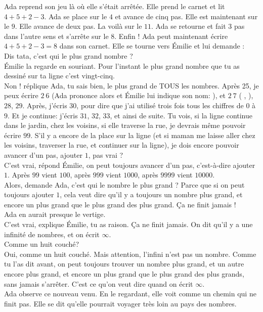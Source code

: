 Ada reprend son jeu là où elle s’était arrêtée. 
Elle prend le carnet et lit $4 + 5 + 2 - 3$. 
Ada se place sur le $4$ et avance de cinq pas. 
Elle est maintenant sur le $9$. 
Elle avance de deux pas. La voilà sur le $11$. 
Ada se retourne et fait $3$ pas dans l’autre sens et s’arrête sur le $8$.
Enfin ! Ada peut maintenant écrire $4 + 5 + 2 - 3 = 8$ dans son carnet.
Elle se tourne vers Émilie et lui demande :\\
\guillemotleft Dis tata, c’est qui le plus grand nombre ? \guillemotright\\
Émilie la regarde en souriant.
\guillemotleft Pour l’instant le plus grand nombre que tu as dessiné sur ta ligne c’est vingt-cinq.\\
\mdash Non ! réplique Ada, tu sais bien, le plus grand de TOUS les nombres. Après 25, je peux écrire $2~6$ (Ada prononce alors  et Émilie lui indique son nom: ), et $2~7$ ( , ), $28$, $29$. Après, j’écris $30$, pour dire que j’ai utilisé trois fois tous les chiffres de $0$ à $9$. Et je continue: j’écris $31$, $32$, $33$, et ainsi de suite. Tu vois, si la ligne continue dans le jardin, chez les voisins, si elle traverse la rue, je devrais même pouvoir écrire $99$. S'il y a encore de la place sur la ligne (et si maman me laisse aller chez les voisins, traverser la rue, et continuer sur la ligne), je dois encore pouvoir avancer d’un pas, ajouter $1$, pas vrai ?\\
\mdash C’est vrai, répond Émilie, on peut toujours avancer d’un pas, c’est-à-dire ajouter $1$. Après $99$ vient $100$, après $999$ vient $1000$, après $9999$ vient $10000$.\\
\mdash Alors, demande Ada, c’est qui le nombre le plus grand ? Parce que si on peut toujours ajouter $1$, cela veut dire qu’il y a toujours un nombre plus grand, et encore un plus grand que le plus grand des plus grand. Ça ne finit jamais ! \guillemotright\\ 
Ada en aurait presque le vertige. \\
\guillemotleft C’est vrai, explique Émilie, tu as raison. Ça ne finit jamais. On dit qu’il y a une infinité de nombres, et on écrit $\infty$.\\
\mdash Comme un huit couché?\\
\mdash Oui, comme un huit couché. Mais attention, l’infini n’est pas un nombre. Comme tu l’as dit avant, on peut toujours trouver un nombre plus grand, et un autre encore plus grand, et encore un plus grand que le plus grand des plus grands, sans jamais s'arrêter. C’est ce qu’on veut dire quand on écrit $\infty$. \guillemotright\\
Ada observe ce nouveau venu. En le regardant, elle voit comme un chemin qui ne finit pas. Elle se dit qu’elle pourrait voyager très loin au pays des nombres.

